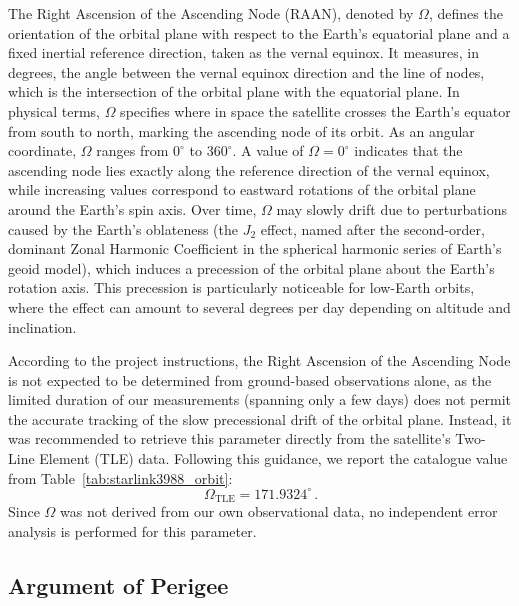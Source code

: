 \documentclass{article}
\begin{document}
The Right Ascension of the Ascending Node (RAAN), denoted by $\Omega$, defines the orientation of the orbital plane with respect to the Earth's equatorial plane and a fixed inertial reference direction, taken as the vernal equinox. It measures, in degrees, the angle between the vernal equinox direction and the line of nodes, which is the intersection of the orbital plane with the equatorial plane. In physical terms, $\Omega$ specifies where in space the satellite crosses the Earth's equator from south to north, marking the ascending node of its orbit. As an angular coordinate, $\Omega$ ranges from $0^{\circ}$ to $360^{\circ}$. A value of $\Omega = 0^{\circ}$ indicates that the ascending node lies exactly along the reference direction of the vernal equinox, while increasing values correspond to eastward rotations of the orbital plane around the Earth's spin axis. Over time, $\Omega$ may slowly drift due to perturbations caused by the Earth's oblateness (the $J_{2}$ effect, named after the second-order, dominant Zonal Harmonic Coefficient in the spherical harmonic series of Earth's geoid model), which induces a precession of the orbital plane about the Earth’s rotation axis. This precession is particularly noticeable for low-Earth orbits, where the effect can amount to several degrees per day depending on altitude and inclination.  

According to the project instructions, the Right Ascension of the Ascending Node is not expected to be determined from ground-based observations alone, as the limited duration of our measurements (spanning only a few days) does not permit the accurate tracking of the slow precessional drift of the orbital plane. Instead, it was recommended to retrieve this parameter directly from the satellite’s Two-Line Element (TLE) data. Following this guidance, we report the catalogue value from Table~\ref{tab:starlink3988_orbit}:
\[
\boxed{\,\Omega_{\mathrm{TLE}} = 171.9324^{\circ}\,}.
\]
Since $\Omega$ was not derived from our own observational data, no independent error analysis is performed for this parameter.

\subsection{Argument of Perigee} \label{sec:arg_of_perigee}
\end{document}
